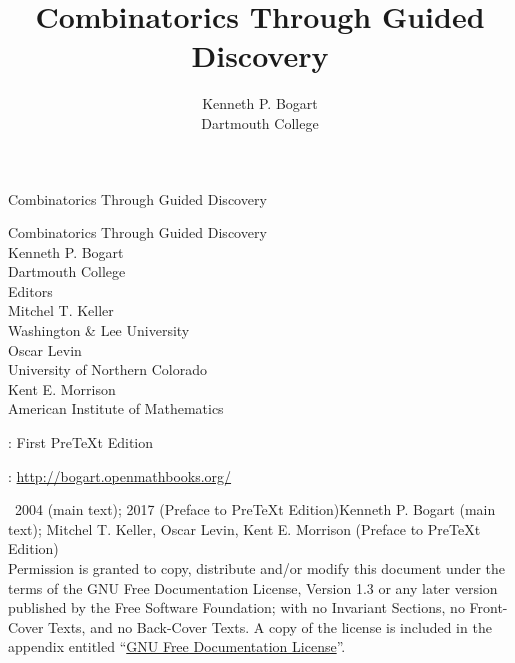 \documentclass[10pt,]{book}
\title{Combinatorics Through Guided Discovery}
\author{Kenneth P. Bogart\\
Dartmouth College
}
\date{}
\theoremstyle{plain}
\theoremstyle{definition}
\theoremstyle{definition}
\numberwithin{equation}{chapter}
\begin{document}
\frontmatter
\thispagestyle{empty}
{\centering
\vspace*{0.28\textheight}
{\Huge Combinatorics Through Guided Discovery}\\}
\clearpage
\thispagestyle{empty}
\null%
\clearpage
\thispagestyle{empty}
{\centering
\vspace*{0.14\textheight}
{\Huge Combinatorics Through Guided Discovery}\\[3\baselineskip]
{\Large Kenneth P. Bogart}\\[0.5\baselineskip]
{\Large Dartmouth College}\\[3\baselineskip]
{\Large Editors}\\[0.5\baselineskip]
{\normalsize Mitchel T. Keller}\\[0.25\baselineskip]
Washington \& Lee University\\[0.5\baselineskip]

{\normalsize Oscar Levin}\\[0.25\baselineskip]
University of Northern Colorado\\[0.5\baselineskip]

{\normalsize Kent E. Morrison}\\[0.25\baselineskip]
American Institute of Mathematics\\
}
\clearpage
\thispagestyle{empty}
\hypertarget{colophon-1}{}
: First PreTeXt Edition\par\medskip
{}: \href{http://bogart.openmathbooks.org/}{http://bogart.openmathbooks.org/}\par\medskip
\noindent\textcopyright\ 2004 (main text); 2017 (Preface to PreTeXt Edition)\quad{}Kenneth P. Bogart (main text); Mitchel T. Keller, Oscar Levin, Kent E. Morrison (Preface to PreTeXt Edition)\\[0.5\baselineskip]
Permission is granted to copy, distribute and/or modify this document under the terms of the GNU Free Documentation License, Version 1.3 or any later version published by the Free Software Foundation; with no Invariant Sections, no Front-Cover Texts, and no Back-Cover Texts.  A copy of the license is included in the appendix entitled ``\hyperref[appendix-gfdl]{GNU Free Documentation License}''.\par\medskip
{}
\null\clearpage
\end{document}
